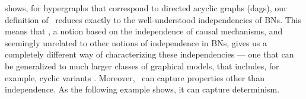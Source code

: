  shows, for hypergraphs that 
correspond to directed acyclic graphs (dags),
    our definition of
    \cibility\ 
    reduces exactly to the well-understood independencies of 
BNs.
This means that \scibility, a notion based on the independence of
causal mechanisms, 
and seemingly unrelated to other notions of independence in BNs,
gives us a completely different way of 
%
characterizing these independencies
\unskip---\unskip
one
that can be generalized to much larger classes of graphical models,
that includes, for example, cyclic variants \citep{Baier_2022}.
Moreover, \scibility\ can capture properties other than
independence.  
As the following example shows, it can capture determinism.

